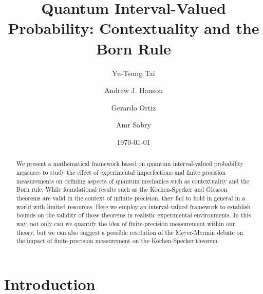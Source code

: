 \documentclass[english,reprint, aps, prl,superscriptaddress, showpacs,
showkeys, longbibliography, amsmath, amssymb, floatfix]{revtex4-1}
\theoremstyle{plain}
\theoremstyle{definition}
\begin{document}
\title{Quantum Interval-Valued Probability: Contextuality and the Born Rule}

\author{Yu-Tsung Tai}

\author{Andrew J. Hanson}

\author{Gerardo Ortiz}

\author{Amr Sabry}

\date{\today}

\begin{abstract}
  We present a mathematical framework based on quantum interval-valued
  probability measures to study the effect of experimental
  imperfections and finite precision measurements on defining aspects
  of quantum mechanics such as contextuality and the Born rule. While
  foundational results such as the Kochen-Specker and Gleason theorems
  are valid in the context of infinite precision, they fail to hold in
  general in a world with limited resources. Here we employ an
  interval-valued framework to establish bounds on the validity of
  those theorems in realistic experimental environments. In this way,
  not only can we quantify the idea of finite-precision measurement
  within our theory, but we can also suggest a possible resolution of
  the Meyer-Mermin debate on the impact of finite-precision
  measurement on the Kochen-Specker theorem.
\end{abstract}



\maketitle

\section{Introduction}
\end{document}
